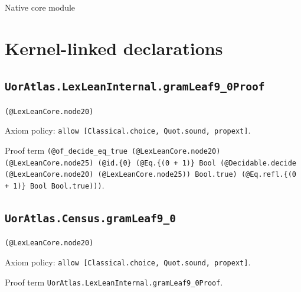 \documentclass[11pt]{article}
\begin{document}
\begin{center}{\LARGE Native core module}\end{center}
\section*{Kernel-linked declarations}
\subsection*{\texttt{UorAtlas.LexLeanInternal.gramLeaf9\_0Proof}}
\noindent\texttt{(@LexLeanCore.node20)}\par
\noindent Axiom policy: \texttt{allow [Classical.choice, Quot.sound, propext]}.\par
\noindent Proof term \texttt{(@of\_decide\_eq\_true (@LexLeanCore.node20) (@LexLeanCore.node25) (@id.\{0\} (@Eq.\{(0 + 1)\} Bool (@Decidable.decide (@LexLeanCore.node20) (@LexLeanCore.node25)) Bool.true) (@Eq.refl.\{(0 + 1)\} Bool Bool.true)))}.\par
\subsection*{\texttt{UorAtlas.Census.gramLeaf9\_0}}
\noindent\texttt{(@LexLeanCore.node20)}\par
\noindent Axiom policy: \texttt{allow [Classical.choice, Quot.sound, propext]}.\par
\noindent Proof term \texttt{UorAtlas.LexLeanInternal.gramLeaf9\_0Proof}.\par
\end{document}
